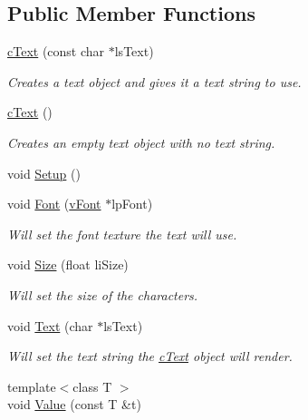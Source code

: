 \subsection*{Public Member Functions}
\begin{DoxyCompactItemize}
\item 
\hyperlink{classc_text_a22c63dd27464b40ed6e30ce5e4244334}{cText} (const char $\ast$lsText)
\begin{DoxyCompactList}\small\item\em Creates a text object and gives it a text string to use. \item\end{DoxyCompactList}\item 
\hyperlink{classc_text_a9784e9fa562a9b942a24e1dbfda0f485}{cText} ()
\begin{DoxyCompactList}\small\item\em Creates an empty text object with no text string. \item\end{DoxyCompactList}\item 
void \hyperlink{classc_text_a589fef21034f30fbf71662d079e7fcd7}{Setup} ()
\item 
void \hyperlink{classc_text_ae0bb8461ef260f710b0ad6a4238fd577}{Font} (\hyperlink{classv_font}{vFont} $\ast$lpFont)
\begin{DoxyCompactList}\small\item\em Will set the font texture the text will use. \item\end{DoxyCompactList}\item 
void \hyperlink{classc_text_ae78617758a56e1c67e40936a0f03748a}{Size} (float liSize)
\begin{DoxyCompactList}\small\item\em Will set the size of the characters. \item\end{DoxyCompactList}\item 
void \hyperlink{classc_text_a7c9689bdce14d24267277a2ebdb08fdf}{Text} (char $\ast$lsText)
\begin{DoxyCompactList}\small\item\em Will set the text string the \hyperlink{classc_text}{cText} object will render. \item\end{DoxyCompactList}\item 
{\footnotesize template$<$class T $>$ }\\void \hyperlink{classc_text_a80b5c9b1cbad8e7045f0437bf34ad92a}{Value} (const T \&t)

\end{DoxyCompactItemize}
